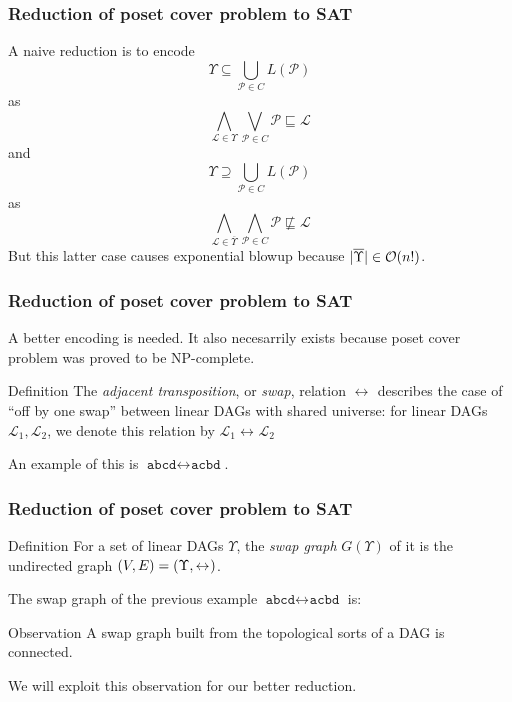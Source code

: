 \documentclass{beamer}
\DeclarePairedDelimiter{\tuple}{(}{)}
\DeclarePairedDelimiter{\abs}{\lvert}{\rvert}
\newcommand{\poset}[1]{\mathcal{#1}}
\newcommand{\lang}[1]{L(#1)}
\newcommand{\lin}[1]{\texttt{#1}}
\newcommand{\swap}[1][]{\leftrightarrow_{#1}}
\newcommand{\sgraph}[1]{G(#1)}
\newcommand{\lext}{\sqsubseteq}
\newcommand{\complmt}[1]{\overline{#1}}
\newcommand{\bigo}[1]{\mathcal{O}(#1)}
\begin{document}
\begin{frame}
    \frametitle{Reduction of poset cover problem to SAT}
    A naive reduction is to encode
    \[
    \Upsilon \subseteq \bigcup_{\poset{P} \in C} \lang{\poset{P}}
    \]
    as
    \[
    \bigwedge_{\poset{L} \in \Upsilon} \bigvee_{\poset{P} \in C} \poset{P} \lext \poset{L}
    \]
    and
    \[
    \Upsilon \supseteq \bigcup_{\poset{P} \in C} \lang{\poset{P}}
    \]
    as
    \[
    \bigwedge_{\poset{L} \in \complmt{\Upsilon}} \bigwedge_{\poset{P} \in C} \poset{P} \not\lext \poset{L}
    \]
    But this latter case causes exponential blowup
    because $\abs{\complmt{\Upsilon}} \in \bigo{n!}$.
\end{frame}

\begin{frame}
    \frametitle{Reduction of poset cover problem to SAT}
    A better encoding is needed. It also necesarrily exists
    because poset cover problem was proved to be NP-complete.
    \begin{block}{Definition}
    The \emph{adjacent transposition}, or \emph{swap},
    relation $\swap$ describes the case of ``off by one swap''
    between linear DAGs with shared universe: for linear DAGs
    $\poset{L}_1,\poset{L}_2$, we denote this relation by
    $\poset{L}_1 \swap \poset{L}_2$
    \end{block}
    An example of this is $\lin{abcd} \swap \lin{acbd}$.
\end{frame}

\begin{frame}
    \frametitle{Reduction of poset cover problem to SAT}
    \begin{block}{Definition}
    For a set of linear DAGs $\Upsilon$,
    the \emph{swap graph} $\sgraph{\Upsilon}$ of it is
    the undirected graph $\tuple{V,E} = \tuple{\Upsilon,\swap}$.
    \end{block}
    The swap graph of the previous example $\lin{abcd} \swap \lin{acbd}$ is:
    \begin{figure}[H]
        \centering
        \label{figure:graphlp}
    \end{figure}
    \begin{block}{Observation}
    A swap graph built from the topological sorts
    of a DAG is connected.
    \end{block}
    We will exploit this observation for our better reduction.
\end{frame}
\end{document}
